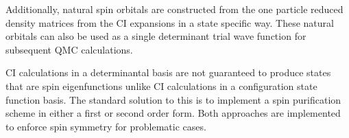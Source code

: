 Additionally, natural spin orbitals are constructed from the one particle reduced density matrices from the CI expansions in a state specific way.
These natural orbitals can also be used as a single determinant trial wave function for subsequent QMC calculations.

CI calculations in a determinantal basis are not guaranteed to produce states that are spin eigenfunctions unlike CI calculations in a configuration state function basis.
The standard solution to this is to implement a spin purification scheme in either a first or second order form.
Both approaches are implemented to enforce spin symmetry for problematic cases.

%

% 
% 

